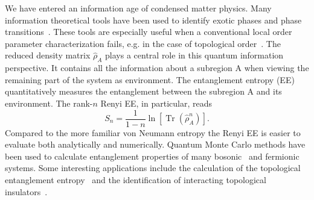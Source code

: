 \documentclass[12pt,onecolumn,english,prl,showpacs,nofootinbib]{revtex4-1}
\DeclareMathOperator{\Tr}{Tr}
\begin{document}
\noindent
We have entered an information age of condensed matter physics. Many information theoretical tools have been used to identify exotic phases and phase transitions~\cite{Feiguin:2007bo, PhysRevLett.99.140405, Isakov:2011fz, Jiang:2012dw, PhysRevLett.109.067201}. These tools are especially useful when a conventional local order parameter characterization fails, e.g. in the case of topological order~\cite{Wen:1990tm}. The reduced density matrix $\hat{\rho}_{A}$ plays a central role in this quantum information perspective. It contains all the information about a subregion A when viewing the remaining part of the system as environment. The entanglement entropy (EE) quantitatively measures the entanglement between the subregion A and its environment. The rank-$n$ Renyi EE, in particular, reads
\begin{equation}
S_{n} = \frac{1}{1-n}\ln \left[\Tr (\hat{\rho}_{A}^{n})\right].
\label{eq:REE}
\end{equation}
Compared to the more familiar von Neumann entropy the Renyi EE is easier to evaluate both analytically and numerically. Quantum Monte Carlo methods have been used to calculate entanglement properties of many bosonic~\cite{Buividovich:2008hz, Hastings:2010dca, Herdman:2014jqa} and fermionic~\cite{Zhang:2011ka, McMinis:2013dp, Grover:2013cs, Broecker:2014ud} systems. Some interesting applications include the calculation of the topological entanglement entropy~\cite{Levin:2006ij, Kitaev:2006dn, Isakov:2011fz} and the identification of interacting topological insulators~\cite{2014PhRvB..89l5121A, Anonymous:XiXakTeu}. 
\end{document}
